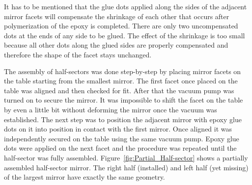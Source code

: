 It has to be mentioned that the glue dots applied along the sides of the adjacent mirror facets will compensate
the shrinkage of each other that occurs after polymerization of the epoxy is completed. There are only two
uncompensated dots at the ends of any side to be glued. The effect of the shrinkage is too small because all other
dots along the glued sides are properly compensated and therefore the shape of the facet stays unchanged. 


The assembly of half-sectors was done step-by-step by placing mirror facets on the table starting from the smallest
mirror. The first facet once placed on the table was aligned and then checked for fit. After that the vacuum pump was
turned on to secure the mirror. It was impossible to shift the facet on the table by even a little bit without deforming
the mirror once the vacuum was established. The next step was to position the adjacent mirror with epoxy glue dots on
it into position in contact with the first mirror. Once aligned it was independently secured on the table using the same
vacuum pump. Epoxy glue dots were applied on the next facet and the procedure was repeated until the half-sector
was fully assembled. Figure~\ref{fig:Partial_Half-sector} shows a partially assembled half-sector mirror. The right
half (installed) and left half (yet missing) of the largest mirror have exactly the same geometry.

